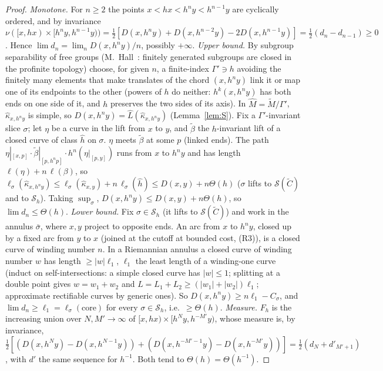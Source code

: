 \documentclass[aps,prd,onecolumn,superscriptaddress,nofootinbib,amsmath,amssymb,11pt]{revtex4-2}
\theoremstyle{definition}
\begin{document}
\begin{proof}
\emph{Monotone.} For $n\ge2$ the points $x<hx<h^ny<h^{n-1}y$ are cyclically ordered, and by invariance
$\nu([x,hx)\times[h^ny,h^{n-1}y))=\frac12[D(x,h^ny)+D(x,h^{n-2}y)-2D(x,h^{n-1}y)]=\frac12(d_n-d_{n-1})\ge0$. Hence $\lim
d_n=\lim_nD(x,h^ny)/n$, possibly $+\infty$.
\emph{Upper bound.} By subgroup separability of free groups (M.~Hall~\cite{Hall1949}: finitely generated subgroups are closed
in the profinite topology) choose, for given $n$, a finite-index $\Gamma'\ni h$ avoiding the finitely many elements that make
translates of the chord $(x,h^ny)$ link it or map one of its endpoints to the other (powers of $h$ do neither: $h^k(x,h^ny)$ has
both ends on one side of it, and $h$ preserves the two sides of its axis). In
$\widehat M=\tilde M/\Gamma'$, $\hat\kappa_{x,h^ny}$ is simple, so $D(x,h^ny)=\hat L(\hat\kappa_{x,h^ny})$ (Lemma~\ref{lem:S}). Fix a
$\Gamma'$-invariant slice $\sigma$; let $\eta$ be a curve in the lift from $x$ to $y$, and $\tilde\beta$ the $h$-invariant lift of a
closed curve of class $\hat h$ on $\sigma$. $\eta$ meets $\tilde\beta$ at some $p$ (linked ends). The path
$\eta|_{[x,p]}\cdot\tilde\beta|_{[p,h^np]}\cdot h^n(\eta|_{[p,y]})$ runs from $x$ to $h^ny$ and has length $\ell(\eta)+n\,\ell(\beta)$, so
$\ell_\sigma(\hat\kappa_{x,h^ny})\le\ell_\sigma(\hat\kappa_{x,y})+n\,\ell_\sigma(\hat h)\le D(x,y)+n\Theta(h)$ ($\sigma$ lifts to $\mathcal S(\tilde C)$
and to $\mathcal S_h$). Taking $\sup_\sigma$, $D(x,h^ny)\le D(x,y)+n\Theta(h)$, so $\lim d_n\le\Theta(h)$.
\emph{Lower bound.} Fix $\sigma\in\mathcal S_h$ (it lifts to $\mathcal S(\tilde C)$) and work in the annulus $\bar\sigma$, where $x,y$ project to
opposite ends. An arc from $x$ to $h^ny$, closed up by a fixed arc from $y$ to $x$ (joined at the cutoff at bounded cost, (R3)),
is a closed curve of winding number $n$. In a Riemannian annulus a closed curve of winding number $w$ has length $\ge|w|\ell_1$,
$\ell_1$ the least length of a winding-one curve (induct on self-intersections: a simple closed curve has $|w|\le1$; splitting at
a double point gives $w=w_1+w_2$ and $L=L_1+L_2\ge(|w_1|+|w_2|)\ell_1$; approximate rectifiable curves by generic ones). So
$D(x,h^ny)\ge n\ell_1-C_\sigma$, and $\lim d_n\ge\ell_1=\ell_\sigma(\text{core})$ for every $\sigma\in\mathcal S_h$, i.e.\ $\ge\Theta(h)$.
\emph{Measure.} $F_h$ is the increasing union over $N,M'\to\infty$ of $[x,hx)\times[h^Ny,h^{-M'}y)$, whose measure is, by invariance,
$\frac12[(D(x,h^Ny)-D(x,h^{N-1}y))+(D(x,h^{-M'-1}y)-D(x,h^{-M'}y))]=\frac12(d_N+d'_{M'+1})$, with $d'$ the same sequence for $h^{-1}$.
Both tend to $\Theta(h)=\Theta(h^{-1})$.
\end{proof}
\end{document}
